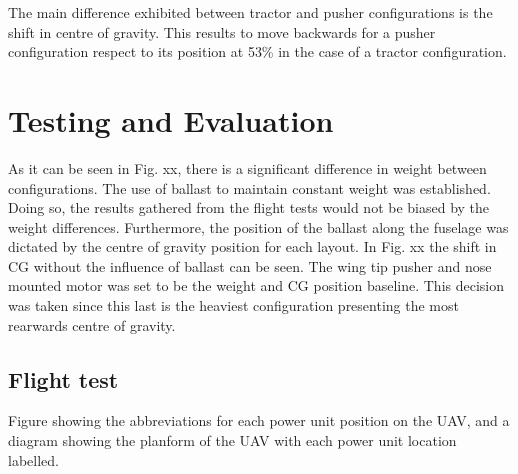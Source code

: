 \documentclass[../../main.tex]{subfiles}
\begin{document}
The main difference exhibited between tractor and pusher configurations is the shift in centre of gravity.
This results to move backwards for a pusher configuration respect to its position at 53\% in the case of a tractor configuration.

\section{Testing and Evaluation} \label{sec:project-review:testing-and-evaluation}


As it can be seen in Fig. xx, there is a significant difference in weight between configurations.
The use of ballast to maintain constant weight was established.
Doing so, the results gathered from the flight tests would not be biased by the weight differences.
Furthermore, the position of the ballast along the fuselage was dictated by the centre of gravity position for each layout.
In Fig. xx the shift in CG without the influence of ballast can be seen.
The wing tip pusher and nose mounted motor was set to be the weight and CG position baseline.
This decision was taken since this last is the heaviest configuration presenting the most rearwards centre of gravity. 


\subsection{Flight test} \label{sec:project-review:testing-and-evaluation:flight-test}

Figure showing the abbreviations for each power unit position on the UAV, and a diagram showing the planform of the UAV with each power unit location labelled. 

\end{document}
